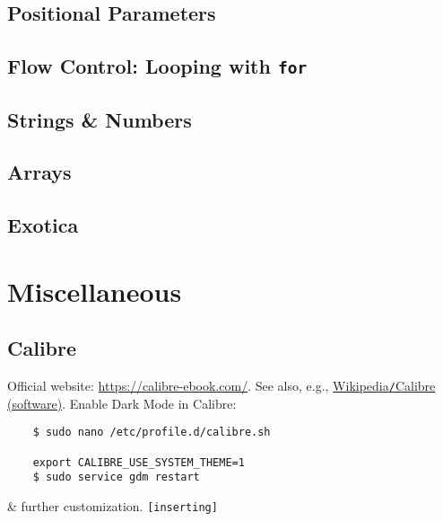 \documentclass[oneside]{book}
\numberwithin{equation}{section}
\begin{document}
\section{Positional Parameters}


\section{Flow Control: Looping with \texttt{for}}


\section{Strings \& Numbers}


\section{Arrays}


\section{Exotica}


\chapter{Miscellaneous}

\section{Calibre}
Official website: \url{https://calibre-ebook.com/}. See also, e.g., \href{https://en.wikipedia.org/wiki/Calibre_(software)}{Wikipedia\texttt{/}Calibre (software)}. Enable Dark Mode in Calibre:
\begin{verbatim}
	$ sudo nano /etc/profile.d/calibre.sh
	
	export CALIBRE_USE_SYSTEM_THEME=1
	$ sudo service gdm restart
\end{verbatim}
\& further customization. \texttt{[inserting]}


\printbibliography[heading=bibintoc]
	
\end{document}
